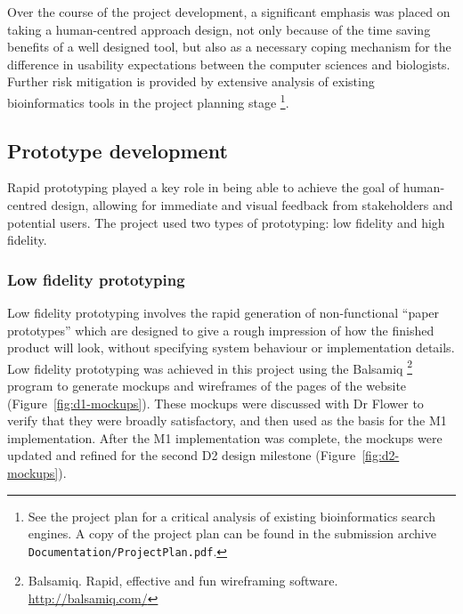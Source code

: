 Over the course of the project development, a significant emphasis was
placed on taking a human-centred approach design, not only because of
the time saving benefits of a well designed tool, but also as a
necessary coping mechanism for the difference in usability
expectations between the computer sciences and biologists. Further
risk mitigation is provided by extensive analysis of existing
bioinformatics tools in the project planning stage \footnote{See the
  project plan for a critical analysis of existing bioinformatics
  search engines. A copy of the project plan can be found in the
  submission archive \texttt{Documentation/ProjectPlan.pdf}.}.

\subsection{Prototype development}

Rapid prototyping played a key role in being able to achieve the goal
of human-centred design, allowing for immediate and visual feedback
from stakeholders and potential users. The project used two types of
prototyping: low fidelity and high fidelity.

\subsubsection*{Low fidelity prototyping}

Low fidelity prototyping involves the rapid generation of
non-functional ``paper prototypes'' which are designed to give a rough
impression of how the finished product will look, without specifying
system behaviour or implementation details. Low fidelity prototyping
was achieved in this project using the
Balsamiq \footnote{Balsamiq. Rapid, effective and fun wireframing
  software. \url{http://balsamiq.com/}} program to generate mockups
and wireframes of the pages of the website
(Figure~\ref{fig:d1-mockups}). These mockups were discussed with Dr
Flower to verify that they were broadly satisfactory, and then used as
the basis for the M1 implementation. After the M1 implementation was
complete, the mockups were updated and refined for the second D2
design milestone (Figure~\ref{fig:d2-mockups}).


